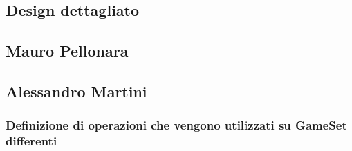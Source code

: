 \subsection{Design dettagliato}
\subsection*{Mauro Pellonara}

\subsection*{Alessandro Martini}

\subsubsection*{Definizione di operazioni che vengono utilizzati su GameSet differenti}
